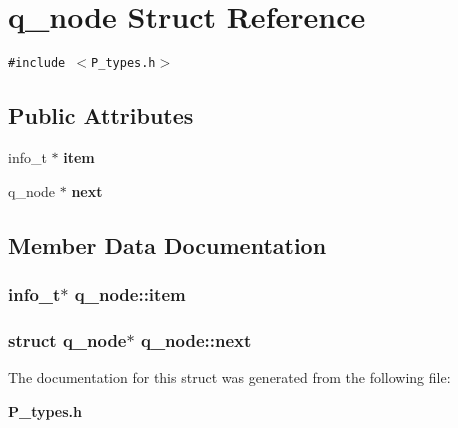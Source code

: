 \section{q\_\-node  Struct Reference}
\label{structq__node}
{\tt \#include $<$P\_\-types.h$>$}

\subsection*{Public Attributes}
\begin{CompactItemize}
\item 
info\_\-t $\ast$ {\bf item}
\item 
q\_\-node $\ast$ {\bf next}
\end{CompactItemize}


\subsection{Member Data Documentation}
\subsubsection{\setlength{\rightskip}{0pt plus 5cm}info\_\-t$\ast$ q\_\-node::item}\label{structq__node_m0}


\subsubsection{\setlength{\rightskip}{0pt plus 5cm}struct q\_\-node$\ast$ q\_\-node::next}\label{structq__node_m1}




The documentation for this struct was generated from the following file:\begin{CompactItemize}
\item 
{\bf P\_\-types.h}\end{CompactItemize}
